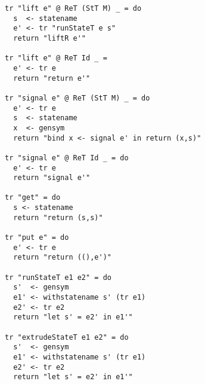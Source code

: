\documentclass{article}[11pt]
\begin{document}
\begin{verbatim}
tr "lift e" @ ReT (StT M) _ = do
  s  <- statename
  e' <- tr "runStateT e s"
  return "liftR e'"

tr "lift e" @ ReT Id _ =
  e' <- tr e
  return "return e'"

tr "signal e" @ ReT (StT M) _ = do
  e' <- tr e
  s  <- statename
  x  <- gensym
  return "bind x <- signal e' in return (x,s)"

tr "signal e" @ ReT Id _ = do
  e' <- tr e
  return "signal e'"

tr "get" = do
  s <- statename
  return "return (s,s)"

tr "put e" = do
  e' <- tr e
  return "return ((),e')"

tr "runStateT e1 e2" = do
  s'  <- gensym
  e1' <- withstatename s' (tr e1)
  e2' <- tr e2
  return "let s' = e2' in e1'"

tr "extrudeStateT e1 e2" = do
  s'  <- gensym
  e1' <- withstatename s' (tr e1)
  e2' <- tr e2
  return "let s' = e2' in e1'"
  
\end{verbatim}
\end{document}
